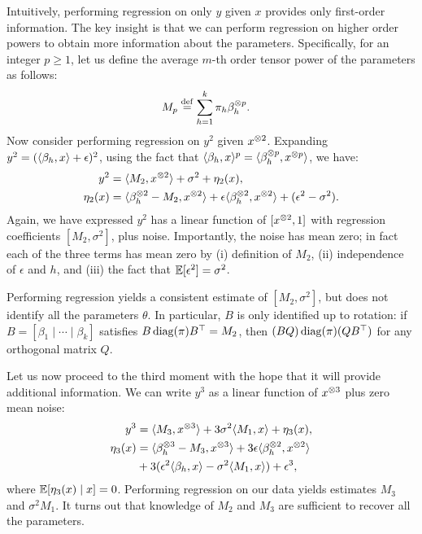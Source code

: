 Intuitively, performing regression on only $y$ given $x$ provides only first-order
information.  The key insight is that we can perform regression
on higher order powers to obtain more information about the parameters.
Specifically, for an integer $p \ge 1$, let us define the average
$m$-th order tensor power of the parameters as follows:
\begin{align}
M_p &\eqdef \sum_{h=1}^k \pi_h \beta_h\tp{p}. \label{eqn:Mp} %
\end{align}
Now consider performing regression on $y^2$ given $x^{\otimes 2}$.
Expanding $y^2 = (\langle \beta_h, x \rangle + \epsilon)^2$,
using the fact that $\langle \beta_h, x \rangle^p = \langle \beta_h^{\otimes p}, x^{\otimes p} \rangle$,
we have:
\begin{align}
y^2 &= \langle M_2, x^{\otimes 2} \rangle + \sigma^2 + \eta_2(x), \label{eqn:y2} \\
\eta_2(x) &= \langle \beta_h^{\otimes 2} - M_2, x^{\otimes 2} \rangle + \epsilon \langle \beta_h^{\otimes 2}, x^{\otimes 2} \rangle + (\epsilon^2 - \sigma^2). \nonumber
\end{align}
Again, we have expressed $y^2$ has a linear function of $[x^{\otimes 2}, 1]$
with regression coefficients $[M_2, \sigma^2]$, plus noise.
Importantly, the noise has mean zero; 
in fact each of the three terms has mean zero
by (i) definition of $M_2$, (ii) independence of $\epsilon$ and $h$,
and (iii) the fact that $\operatorname{\mathbb{E}}[\epsilon^2] = \sigma^2$.

Performing regression yields a consistent estimate of $[M_2, \sigma^2]$,
but does not identify all the parameters $\theta$.
In particular, $B$ is only identified up to rotation:
if $B = [\beta_1 \mid \cdots \mid \beta_k]$ satisfies
$B \operatorname{diag}(\pi) B^\top = M_2$, then $(B Q) \operatorname{diag}(\pi) (Q B^\top)$
for any orthogonal matrix $Q$.

Let us now proceed to the third moment with the hope that it will
provide additional information.
We can write $y^3$ as a linear function of $x^{\otimes 3}$ plus zero mean noise:
\begin{align}
y^3 &= \langle M_3, x^{\otimes 3} \rangle + 3\sigma^2 \langle M_1, x \rangle + \eta_3(x), \label{eqn:y3} \\
\eta_3(x) &= \langle \beta_h^{\otimes 3} - M_3, x^{\otimes 3} \rangle
+ 3 \epsilon \langle \beta_h^{\otimes 2}, x^{\otimes 2} \rangle \nonumber \\
&+ 3(\epsilon^2 \langle \beta_h, x \rangle - \sigma^2 \langle M_1, x \rangle)
+ \epsilon^3, \nonumber
\end{align}
where $\operatorname{\mathbb{E}}[\eta_3(x) \mid x] = 0$.
Performing regression on our data yields estimates $M_3$ and $\sigma^2 M_1$.
It turns out that knowledge of $M_2$ and $M_3$ are sufficient to recover
all the parameters.

